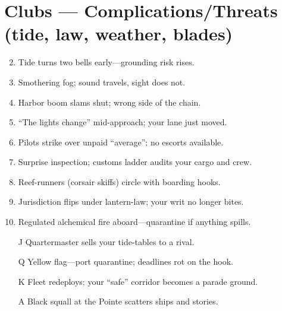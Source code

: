 \section*{Clubs --- Complications/Threats (tide, law, weather, blades)}
\begin{enumerate}
\setcounter{enumi}{1}
\item Tide turns two bells early---grounding risk rises.
\item Smothering fog; sound travels, sight does not.
\item Harbor boom slams shut; wrong side of the chain.
\item ``The lights change'' mid-approach; your lane just moved.
\item Pilots strike over unpaid ``average''; no escorts available.
\item Surprise inspection; customs ladder audits your cargo and crew.
\item Reef-runners (corsair skiffs) circle with boarding hooks.
\item Jurisdiction flips under lantern-law; your writ no longer bites.
\item Regulated alchemical fire aboard---quarantine if anything spills.
\item[J] Quartermaster sells your tide-tables to a rival.
\item[Q] Yellow flag---port quarantine; deadlines rot on the hook.
\item[K] Fleet redeploys; your ``safe'' corridor becomes a parade ground.
\item[A] Black squall at the Pointe scatters ships and stories.
\end{enumerate}

